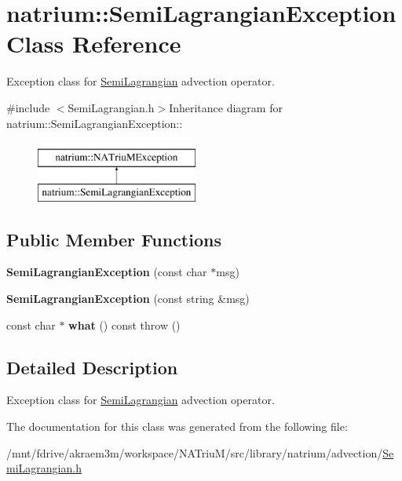 \hypertarget{classnatrium_1_1SemiLagrangianException}{
\section{natrium::SemiLagrangianException Class Reference}
\label{classnatrium_1_1SemiLagrangianException}
}


Exception class for \hyperlink{classnatrium_1_1SemiLagrangian}{SemiLagrangian} advection operator.  


{\ttfamily \#include $<$SemiLagrangian.h$>$}Inheritance diagram for natrium::SemiLagrangianException::\begin{figure}[H]
\begin{center}
\leavevmode
\includegraphics[height=2cm]{classnatrium_1_1SemiLagrangianException}
\end{center}
\end{figure}
\subsection*{Public Member Functions}
\begin{DoxyCompactItemize}
\item 
\hypertarget{classnatrium_1_1SemiLagrangianException_aa90746b399c04e6b4236d273e9d61031}{
{\bfseries SemiLagrangianException} (const char $\ast$msg)}
\label{classnatrium_1_1SemiLagrangianException_aa90746b399c04e6b4236d273e9d61031}

\item 
\hypertarget{classnatrium_1_1SemiLagrangianException_a4de4085b6a2a7ea0668bfdd03d887875}{
{\bfseries SemiLagrangianException} (const string \&msg)}
\label{classnatrium_1_1SemiLagrangianException_a4de4085b6a2a7ea0668bfdd03d887875}

\item 
\hypertarget{classnatrium_1_1SemiLagrangianException_a0b39a40a2d577924776147a0431ad5b3}{
const char $\ast$ {\bfseries what} () const   throw ()}
\label{classnatrium_1_1SemiLagrangianException_a0b39a40a2d577924776147a0431ad5b3}

\end{DoxyCompactItemize}


\subsection{Detailed Description}
Exception class for \hyperlink{classnatrium_1_1SemiLagrangian}{SemiLagrangian} advection operator. 

The documentation for this class was generated from the following file:\begin{DoxyCompactItemize}
\item 
/mnt/fdrive/akraem3m/workspace/NATriuM/src/library/natrium/advection/\hyperlink{SemiLagrangian_8h}{SemiLagrangian.h}\end{DoxyCompactItemize}
